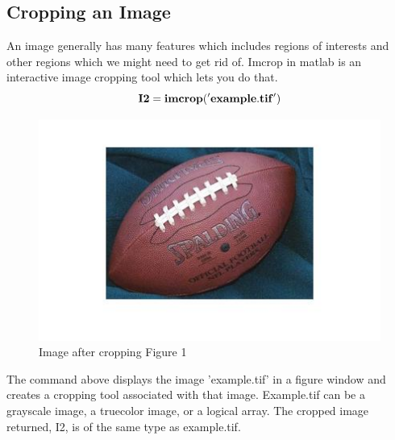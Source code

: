 \documentclass[12pt]{article}
\begin{document}
    \subsection{Cropping an Image}
	An image generally has many features which includes regions of interests and other regions which we might need to get rid of. Imcrop in matlab is an interactive image cropping tool which lets you do that. 
   \[{\bf I2 = imcrop('example.tif')}\]
    \clearpage
    \begin{figure}
       \centering
      \includegraphics[scale=0.5]{footballcrop.jpg}
      \caption{Image after cropping Figure 1}
      \end{figure}
    The command above displays the image 'example.tif' in a figure window and creates a cropping tool associated with that image. Example.tif can be a grayscale image, a truecolor image, or a logical array. The cropped image returned, I2, is of the same type as example.tif.
\end{document}
